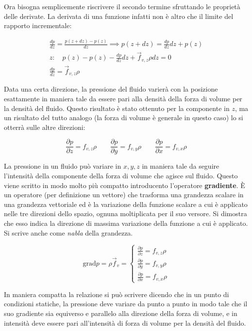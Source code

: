 Ora bisogna semplicemente riscrivere il secondo termine sfruttando le proprietà delle derivate. La derivata di una funzione infatti non è altro che il limite del rapporto incrementale:

\begin{gather*}
	\frac{dp}{dz} = \frac{p(z+dz)-p(z)}{dz} \implies p(z+dz)=\frac{dp}{dz}dz + p(z) \\
	z:\quad p(z)-p(z) - \frac{dp}{dz}dz + \vec{f}_{v,z}\rho dz =0 \\
	\frac{dp}{dz} = \vec{f}_{v,z}\rho
\end{gather*}

Data una certa direzione, la pressione del fluido varierà con la posizione esattamente in maniera tale da essere pari alla densità della forza di volume per la densità del fluido. Questo risultato è stato ottenuto per la componente in $z$, ma un risultato del tutto analogo (la forza di volume è generale in questo caso) lo si otterrà sulle altre direzioni:

\[
	\frac{\partial p}{\partial z}  = f_{v,z}\rho \qquad \frac{\partial p}{\partial y}  = f_{v,y}\rho \qquad \frac{\partial p}{\partial x}  = f_{v,x}\rho
\]

La pressione in un fluido può variare in $x, y, z$ in maniera tale da seguire l'intensità della componente della forza di volume che agisce sul fluido. Questo viene scritto in modo molto più compatto introducento l'operatore \textbf{gradiente}.  È un operatore (per definizione un vettore) che trasforma una grandezza scalare in una grandezza vettoriale ed è la variazione della funzione scalare a cui è applicato nelle tre direzioni dello spazio, ognuna moltiplicata per il suo versore.  Si dimostra che esso indica la direzione di massima variazione della funzione a cui è applicato. Si scrive anche come \emph{nabla} della grandezza.

\[
	\text{grad}p = \rho \vec{f}_v = \left\{ \begin{array}{r}
	 	\frac{\partial p}{\partial z} = f_{v,z}\rho \\
	 	\frac{\partial p}{\partial y} = f_{v,y}\rho \\
	 	\frac{\partial p}{\partial x} = f_{v,x}\rho
	\end{array} \right.
\]

In maniera compatta la relazione si può scrivere dicendo che in un punto di condizioni statiche, la pressione deve variare da punto a punto in modo tale che il suo gradiente sia equiverso e parallelo alla direzione della forza di volume, e in intensità deve essere pari all'intensità di forza di volume per la densità del fluido.

